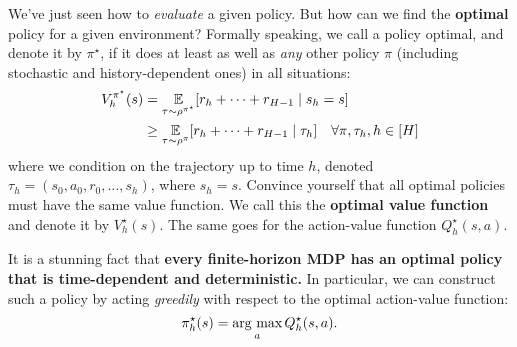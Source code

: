 \documentclass[../main/main]{subfiles}
\begin{document}
We've just seen how to \emph{evaluate} a given policy. But how can we find the \textbf{optimal} policy for a given environment? Formally speaking, we call a policy optimal, and denote it by $\pi^\star$, if it does at least as well as \emph{any} other policy $\pi$ (including stochastic and history-dependent ones) in all situations:
\begin{equation}
    \begin{aligned}
        V_h^{\pi^\star}(s) &= \operatorname*{\mathbb{E}}_{\tau \sim \rho^{\pi^{\star}}}[r_h + \cdots + r_{H-1} \mid s_h = s] \\
        &\ge \operatorname*{\mathbb{E}}_{\tau \sim \rho^{\pi}}[r_h + \cdots + r_{H-1} \mid \tau_h] \quad \forall \pi, \tau_h, h \in [H]
    \end{aligned}
    \label{eq:optimal_policy_finite}
\end{equation}
where we condition on the trajectory up to time $h$, denoted $\tau_h = (s_0, a_0, r_0, \dots, s_h)$, where $s_h = s$.
Convince yourself that all optimal policies must have the same value function. We call this the \textbf{optimal value function} and denote it by $V_h^\star(s)$. The same goes for the action-value function $Q_h^\star(s, a)$.

It is a stunning fact that \textbf{every finite-horizon MDP has an optimal policy that is time-dependent and deterministic.} In particular, we can construct such a policy by acting \emph{greedily} with respect to the optimal action-value function:
\[
    \pi_h^\star(s) = \operatorname*{\textrm{arg\ max}}_a Q_h^\star(s, a).
\]
\end{document}
